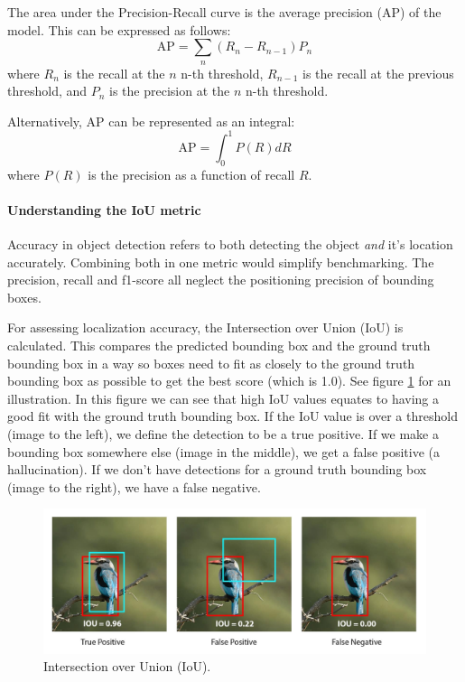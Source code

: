 The area under the Precision-Recall curve is the average precision (AP) of the model. This can be expressed as follows:
\begin{equation}
    \text{AP} = \sum_{n} (R_n - R_{n-1}) P_n
\end{equation}
where $R_n$ is the recall at the $n$ n-th threshold, $R_{n-1}$ is the recall at the previous threshold, and $P_n$ is the precision at the $n$ n-th threshold.

Alternatively, AP can be represented as an integral:
\begin{equation}
    \text{AP} = \int_{0}^{1} P(R) dR
\end{equation}
where $P(R)$ is the precision as a function of recall $R$. 


\paragraph{Understanding the IoU metric}

Accuracy in object detection refers to both detecting the object \textit{and} it's location accurately. Combining both in one metric would simplify benchmarking. The precision, recall and f1-score all neglect the positioning precision of bounding boxes. 

For assessing localization accuracy, the Intersection over Union (IoU) is calculated. This compares the predicted bounding box and the ground truth bounding box in a way so boxes need to fit as closely to the ground truth bounding box as possible to get the best score (which is 1.0). See figure \ref{fig:IoU} for an illustration. In this figure we can see that high IoU values equates to having a good fit with the ground truth bounding box. If the IoU value is over a threshold (image to the left), we define the detection to be a true positive. If we make a bounding box somewhere else (image in the middle), we get a false positive (a hallucination). If we don't have detections for a ground truth bounding box (image to the right), we have a false negative.

\begin{figure}[H]
    \centering
    \includegraphics[width=1.0\linewidth]{Images/Diagrams/IoU_better.jpg}
    \caption{Intersection over Union (IoU).}
    \label{fig:IoU}
\end{figure}


